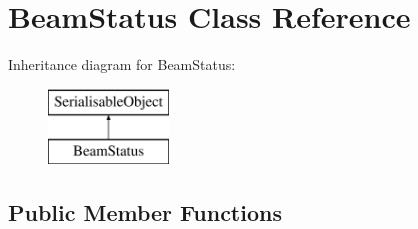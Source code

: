 \hypertarget{classBeamStatus}{\section{Beam\-Status Class Reference}
\label{classBeamStatus}
}
Inheritance diagram for Beam\-Status\-:\begin{figure}[H]
\begin{center}
\leavevmode
\includegraphics[height=2.000000cm]{classBeamStatus}
\end{center}
\end{figure}
\subsection*{Public Member Functions}
